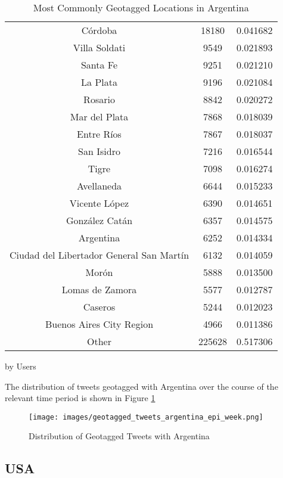 \begin{table}
\begin{subtable}[c]{0.5\textwidth}
\begin{tabular}{|c|c|c|}
    Córdoba & 18180 & 0.041682 \\
    Villa Soldati & 9549 & 0.021893 \\
    Santa Fe & 9251 & 0.021210 \\
    La Plata & 9196 & 0.021084 \\
    Rosario & 8842 & 0.020272 \\
    Mar del Plata & 7868 & 0.018039 \\
    Entre Ríos & 7867 & 0.018037 \\
    San Isidro & 7216 & 0.016544 \\
    Tigre & 7098 & 0.016274 \\
    Avellaneda & 6644 & 0.015233 \\
    Vicente López & 6390 & 0.014651 \\
    González Catán & 6357 & 0.014575 \\
    Argentina & 6252 & 0.014334 \\
    Ciudad del Libertador General San Martín & 6132 & 0.014059 \\
    Morón & 5888 & 0.013500 \\
    Lomas de Zamora & 5577 & 0.012787 \\
    Caseros & 5244 & 0.012023 \\
    Buenos Aires City Region & 4966 & 0.011386 \\
    Other & 225628 & 0.517306 \\
    \hline
    \end{tabular}
\caption{by Users}
\end{subtable}
\caption{Most Commonly Geotagged Locations in Argentina}
\label{table:geotagged-argentina}
\end{table}

The distribution of tweets geotagged with Argentina over the course of the relevant time period is shown in Figure \ref{fig:geotagged-tweets-argentina-epi-week}

\begin{figure}[H]
    \centering
    \texttt{[image: images/geotagged\_tweets\_argentina\_epi\_week.png]}
    
    \caption{Distribution of Geotagged Tweets with Argentina}
    \label{fig:geotagged-tweets-argentina-epi-week}
\end{figure}

\subsection{USA}


